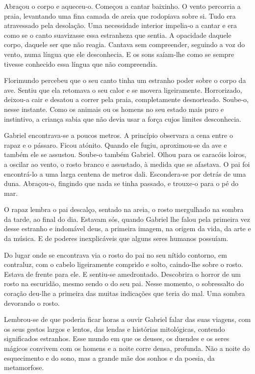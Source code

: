 Abraçou o corpo e aqueceu-o. Começou a cantar baixinho. O vento
percorria a praia, levantando uma fina camada de areia que rodopiava
sobre si. Tudo era atravessado pela desolação. Uma necessidade interior
impelia-o a cantar e era como se o canto suavizasse essa estranheza que
sentia. A opacidade daquele corpo, daquele ser que não reagia. Cantava
sem compreender, seguindo a voz do vento, numa língua que ele
desconhecia. E os sons saíam-lhe como se sempre tivesse conhecido essa
língua que não compreendia.

Florimundo percebeu que o seu canto tinha um estranho poder sobre o
corpo da ave. Sentiu que ela retomava o seu calor e se movera
ligeiramente. Horrorizado, deixou-a cair e desatou a correr pela praia,
completamente desnorteado. Soube-o, nesse instante. Como os animais ou
os homens no seu estado mais puro e instintivo, a criança sabia que não
devia usar a força cujos limites desconhecia.

Gabriel encontrava-se a poucos metros. A princípio observara a cena
entre o rapaz e o pássaro. Ficou atónito. Quando ele fugiu, aproximou-se
da ave e também ele se assustou. Soube-o também Gabriel. Olhou para os
caracóis loiros, a oscilar ao vento, o rosto branco e assustado, à
medida que se afastava. O pai foi encontrá-lo a uma larga centena de
metros dali. Escondera-se por detrás de uma duna. Abraçou-o, fingindo
que nada se tinha passado, e trouxe-o para o pé do mar.

O rapaz lembra o pai descalço, sentado na areia, o rosto mergulhado na
sombra da tarde, ao final do dia. Estavam sós, quando Gabriel lhe falou
pela primeira vez desse estranho e indomável deus, a primeira imagem, na
origem da vida, da arte e da música. E de poderes inexplicáveis que
alguns seres humanos possuíam.

Do lugar onde se encontrava via o rosto do pai no seu nítido contorno,
em contraluz, com o cabelo ligeiramente comprido e solto, caindo-lhe
sobre o rosto. Estava de frente para ele. E sentiu-se amedrontado.
Descobrira o horror de um rosto na escuridão, mesmo sendo o do seu pai.
Nesse momento, o sobressalto do coração deu-lhe a primeira das muitas
indicações que teria do mal. Uma sombra devorando o rosto.

Lembrou-se de que poderia ficar horas a ouvir Gabriel falar das suas
viagens, com os seus gestos largos e lentos, das lendas e histórias
mitológicas, contendo significados estranhos. Esse mundo em que os
deuses, os duendes e os seres mágicos convivem com os homens e a noite
corre densa, profunda. Não a noite do esquecimento e do sono, mas a
grande mãe dos sonhos e da poesia, da metamorfose.

